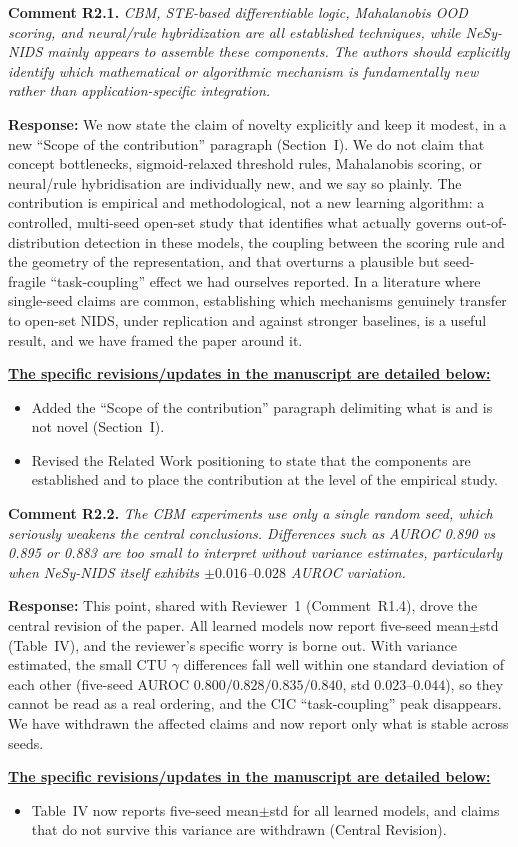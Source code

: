 \documentclass[11pt]{article}
\newcommand{\cmt}[2]{\medskip\noindent\textbf{Comment #1.} \textit{#2}\par}
\newcommand{\resp}{\smallskip\par\noindent\textbf{Response:} }
\newcommand{\revs}{\smallskip\par\noindent\underline{\textbf{The specific revisions/updates in the manuscript are detailed below:}}\par}
\begin{document}
\cmt{R2.1}{CBM, STE-based differentiable logic, Mahalanobis OOD scoring, and
neural/rule hybridization are all established techniques, while NeSy-NIDS mainly
appears to assemble these components. The authors should explicitly identify
which mathematical or algorithmic mechanism is fundamentally new rather than
application-specific integration.}
\resp We now state the claim of novelty explicitly and keep it modest, in a new
``Scope of the contribution'' paragraph (Section~I). We do not claim that concept
bottlenecks, sigmoid-relaxed threshold rules, Mahalanobis scoring, or neural/rule
hybridisation are individually new, and we say so plainly. The contribution is
empirical and methodological, not a new learning algorithm: a controlled,
multi-seed open-set study that identifies what actually governs
out-of-distribution detection in these models, the coupling between the scoring
rule and the geometry of the representation, and that overturns a plausible but
seed-fragile ``task-coupling'' effect we had ourselves reported. In a literature
where single-seed claims are common, establishing which mechanisms genuinely
transfer to open-set NIDS, under replication and against stronger baselines, is a
useful result, and we have framed the paper around it.
\revs
\begin{itemize}
  \item Added the ``Scope of the contribution'' paragraph delimiting what is and
  is not novel (Section~I).
  \item Revised the Related Work positioning to state that the components are
  established and to place the contribution at the level of the empirical study.
\end{itemize}

\cmt{R2.2}{The CBM experiments use only a single random seed, which seriously
weakens the central conclusions. Differences such as AUROC 0.890 vs 0.895 or
0.883 are too small to interpret without variance estimates, particularly when
NeSy-NIDS itself exhibits $\pm0.016$--$0.028$ AUROC variation.}
\resp This point, shared with Reviewer~1 (Comment~R1.4), drove the central revision
of the paper. All learned models now report five-seed mean$\pm$std (Table~IV), and
the reviewer's specific worry is borne out. With variance estimated, the small CTU
$\gamma$ differences fall well within one standard deviation of each other
(five-seed AUROC $0.800/0.828/0.835/0.840$, std $0.023$--$0.044$), so they cannot
be read as a real ordering, and the CIC ``task-coupling'' peak disappears. We have
withdrawn the affected claims and now report only what is stable across seeds.
\revs
\begin{itemize}
  \item Table~IV now reports five-seed mean$\pm$std for all learned models, and
  claims that do not survive this variance are withdrawn (Central Revision).
\end{itemize}
\end{document}
